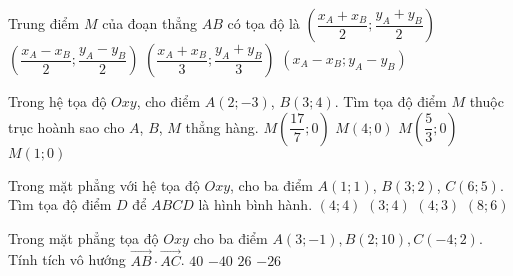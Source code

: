 \begin{ex}
	Trung điểm $M$ của đoạn thẳng $AB$ có tọa độ là
	\choice
	{\True $\left(\dfrac{x_A+x_B}{2};\dfrac{y_A+y_B}{2}\right)$}
	{$\left(\dfrac{x_A-x_B}{2};\dfrac{y_A-y_B}{2}\right)$}
	{$\left(\dfrac{x_A+x_B}{3};\dfrac{y_A+y_B}{3}\right)$}
	{$(x_A-x_B;y_A-y_B)$}
\end{ex}

\begin{ex}%
	Trong hệ tọa độ $Oxy$, cho điểm $A(2;-3)$, $B(3;4)$. Tìm tọa độ điểm $M$ thuộc trục hoành sao cho $A$, $B$, $M$ thẳng hàng.
	\choice
	{\True $M\left(\dfrac{17}{7}; 0\right)$}
	{$M(4; 0)$}
	{$M\left(\dfrac{5}{3}; 0\right)$}
	{$M(1; 0)$}
\end{ex}

\begin{ex}%
	Trong mặt phẳng với hệ tọa độ $Oxy$, cho ba điểm $A(1;1)$, $B(3;2)$, $C(6;5)$. Tìm tọa độ điểm $D$ để $ABCD$ là hình bình hành.
	\choice
	{\True $(4;4)$}
	{$(3;4)$}
	{$(4;3)$}
	{$(8;6)$}
\end{ex}

\begin{ex}%
	Trong mặt phẳng tọa độ $Oxy$ cho ba điểm $A\left( 3;-1 \right),B\left( 2;10 \right),C\left( -4;2 \right)$. Tính tích vô hướng $\overrightarrow{AB}\cdot \overrightarrow{AC}$.
	\choice
	{\True $40$}
	{$-40$}
	{$26$}
	{$-26$}
\end{ex}


